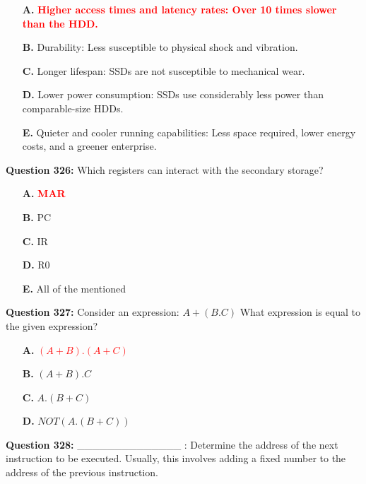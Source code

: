 \documentclass[12pt,a4paper]{article}
\begin{document}
\begin{itemize}
    \item[\textbf{A.}] \textcolor{red}{\textbf{Higher access times and latency rates: Over 10 times slower than the HDD.}}
    \item[\textbf{B.}] Durability: Less susceptible to physical shock and vibration.
    \item[\textbf{C.}] Longer lifespan: SSDs are not susceptible to mechanical wear.
    \item[\textbf{D.}] Lower power consumption: SSDs use considerably less power than comparable-size HDDs.
    \item[\textbf{E.}] Quieter and cooler running capabilities: Less space required, lower energy costs, and a greener enterprise.
\end{itemize}

\vspace{0.5cm}

\textbf{Question 326:} Which registers can interact with the secondary storage?

\begin{itemize}
    \item[\textbf{A.}] \textcolor{red}{\textbf{MAR}}
    \item[\textbf{B.}] PC
    \item[\textbf{C.}] IR
    \item[\textbf{D.}] R0
    \item[\textbf{E.}] All of the mentioned
\end{itemize}

\vspace{0.5cm}

\textbf{Question 327:} Consider an expression: $A + (B.C)$ What expression is equal to the given expression?

\begin{itemize}
    \item[\textbf{A.}] \textcolor{red}{\textbf{$(A + B).(A + C)$}}
    \item[\textbf{B.}] $(A + B).C$
    \item[\textbf{C.}] $A.(B + C)$
    \item[\textbf{D.}] $NOT(A.(B + C))$
\end{itemize}

\vspace{0.5cm}

\textbf{Question 328:} ______________ : Determine the address of the next instruction to be executed. Usually, this involves adding a fixed number to the address of the previous instruction.
\end{document}
